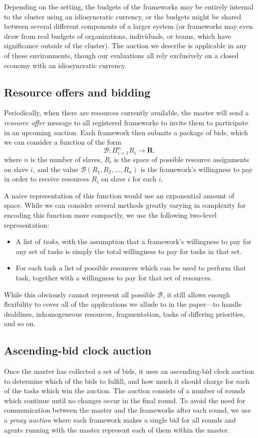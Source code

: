 \documentclass{acm_proc_article-sp}
\begin{document}
Depending on the setting, the budgets of the frameworks may be entirely internal to the cluster
using an idiosyncratic currency,
or the budgets might be shared between several different components of a larger system
(or frameworks may even draw from real budgets of organizations, individuals, or teams,
which have significance outside of the cluster).
The auction we describe is applicable in any of these environments,
though our evaluations all rely exclusively on a closed economy with an idiosyncratic currency.

\subsection{Resource offers and bidding}
Periodically, when there are resources currently available, the master will
send a \emph{resource offer} message to all registered frameworks to invite them
to participate in an upcoming auction. Each framework then submits a package of
bids, which we can consider a function of the form
\[ \mathcal{B}: \Pi_{i=1}^n R_i \rightarrow \mathbf{R}. \]
where $n$ is the number of slaves, 
$R_i$ is the space of possible resource assignments on slave $i$,
and the value $\mathcal{B}\left(R_1, R_2, \ldots, R_n\right)$ is the framework's
willingness to pay in order to receive resources $R_i$ on slave $i$ for each $i$.

A naive representation of this function would use an exponential amount of
space. While we can consider several methods greatly varying in
complexity for encoding this function more compactly, we use the following
two-level representation:
\begin{itemize}
  \item A list of \emph{tasks}, with the assumption that a framework's
    willingness to pay for any set of tasks is simply the total
    willingness to pay for tasks in that set.
  \item For each task a list of possible resources which can be used to perform
    that task, together with a willingness to pay for that set of resources.
\end{itemize}
While this obviously cannot represent all possible $\mathcal{B}$, it still
allows enough flexibility to cover all of the applications we allude to
in the paper---to handle dealdines, inhomogeneous resources, fragmentation,
tasks of differing priorities, and so on.

\subsection{Ascending-bid clock auction}
Once the master has collected a set of bids, it uses an ascending-bid clock
auction to determine which of the bids to fulfill, and how much it should charge
for each of the tasks which win the auction. The auction consists of a number of
rounds which continue until no changes occur in the final round. To avoid the
need for communication between the master and the frameworks after each round,
we use a \emph{proxy auction} where each framework makes a single bid for all
rounds and agents running with the master represent each of them within the
master.
\end{document}

